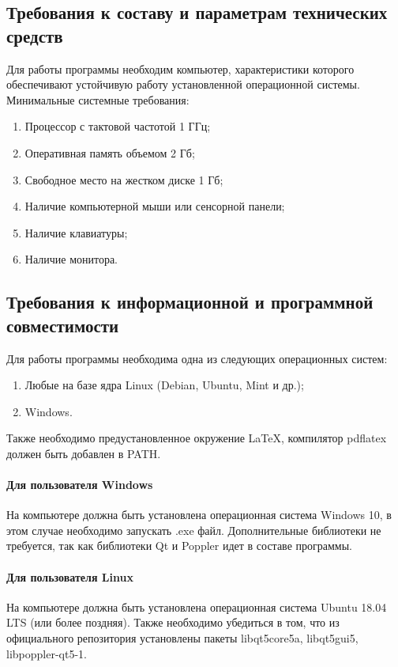 \documentclass[techtask]{espd}
\begin{document}
\subsection{Требования к составу и параметрам технических средств}\label{subsection:requirements}
Для работы программы необходим компьютер, характеристики которого обеспечивают устойчивую работу установленной операционной системы. Минимальные системные требования:

\begin{enumerate}
\item Процессор с тактовой частотой 1 ГГц;
\item Оперативная память объемом 2 Гб;
\item Свободное место на жестком диске 1 Гб;
\item Наличие компьютерной мыши или сенсорной панели;
\item Наличие клавиатуры;
\item Наличие монитора.
\end{enumerate}

\subsection{Требования к информационной и программной совместимости}
Для работы программы необходима одна из следующих операционных систем:

\begin{enumerate}
\item Любые на базе ядра Linux (Debian, Ubuntu, Mint и др.);
\item Windows.
\end{enumerate}

Также необходимо предустановленное окружение LaTeX, компилятор pdflatex должен быть добавлен в PATH.

\paragraph{Для пользователя Windows}
На компьютере должна быть установлена операционная система Windows 10, в этом случае необходимо запускать .exe файл. Дополнительные библиотеки не требуется, так как библиотеки Qt и Poppler идет в составе программы.

\paragraph{Для пользователя Linux}
На компьютере должна быть установлена операционная система Ubuntu 18.04 LTS (или более поздняя). Также необходимо убедиться в том, что из официального репозитория установлены пакеты libqt5core5a, libqt5gui5, libpoppler-qt5-1.
\end{document}
